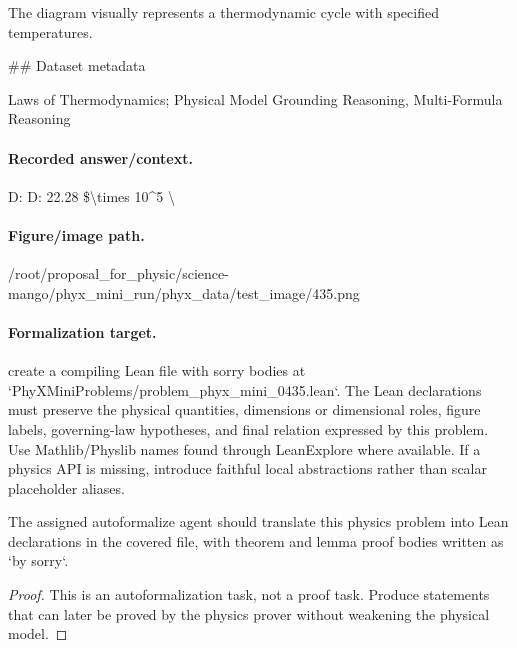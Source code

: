 The diagram visually represents a thermodynamic cycle with specified temperatures.

\#\# Dataset metadata

Laws of Thermodynamics; Physical Model Grounding Reasoning, Multi-Formula Reasoning

\paragraph{Recorded answer/context.}
D: D: 22.28 \$\textbackslash{}times 10\textasciicircum{}5 \textbackslash{}

\paragraph{Figure/image path.}
/root/proposal\_for\_physic/science-mango/phyx\_mini\_run/phyx\_data/test\_image/435.png

\paragraph{Formalization target.}
create a compiling Lean file with sorry bodies at `PhyXMiniProblems/problem\_phyx\_mini\_0435.lean`. The Lean declarations must preserve the physical quantities, dimensions or dimensional roles, figure labels, governing-law hypotheses, and final relation expressed by this problem.
Use Mathlib/Physlib names found through LeanExplore where available. If a physics API is missing, introduce faithful local abstractions rather than scalar placeholder aliases.

\begin{theorem}
\label{thm:physics:phyx_mini_0435:target}
The assigned autoformalize agent should translate this physics problem into Lean declarations in the covered file, with theorem and lemma proof bodies written as `by sorry`.
\end{theorem}
\begin{proof}
This is an autoformalization task, not a proof task. Produce statements that can later be proved by the physics prover without weakening the physical model.
\end{proof}

